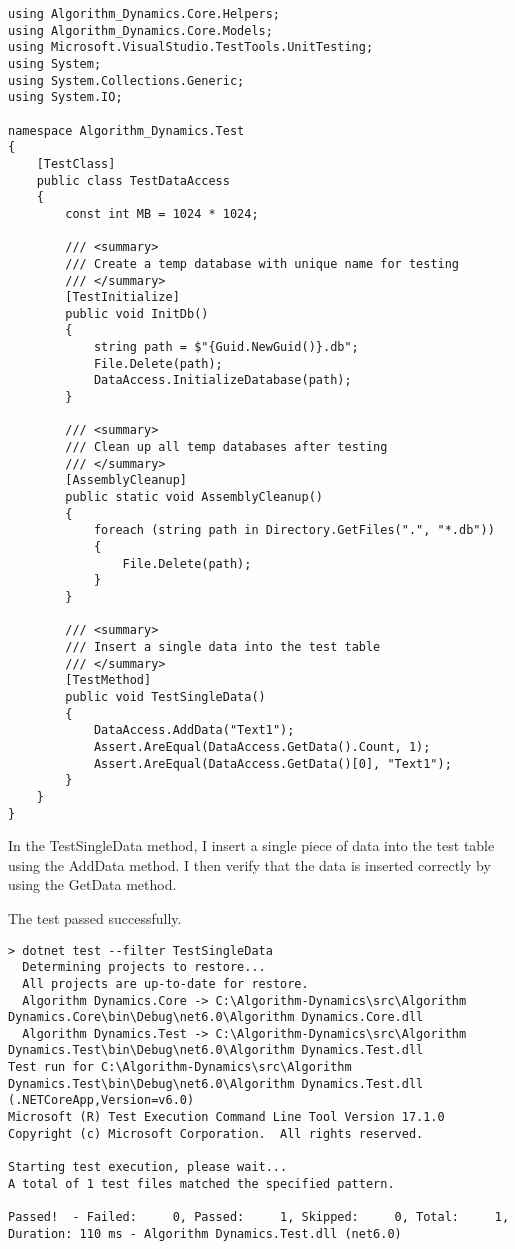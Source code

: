 \documentclass[report.tex]{subfiles}
\begin{document}
\begin{verbatim}
using Algorithm_Dynamics.Core.Helpers;
using Algorithm_Dynamics.Core.Models;
using Microsoft.VisualStudio.TestTools.UnitTesting;
using System;
using System.Collections.Generic;
using System.IO;

namespace Algorithm_Dynamics.Test
{
    [TestClass]
    public class TestDataAccess
    {
        const int MB = 1024 * 1024;

        /// <summary>
        /// Create a temp database with unique name for testing
        /// </summary>
        [TestInitialize]
        public void InitDb()
        {
            string path = $"{Guid.NewGuid()}.db";
            File.Delete(path);
            DataAccess.InitializeDatabase(path);
        }

        /// <summary>
        /// Clean up all temp databases after testing
        /// </summary>
        [AssemblyCleanup]
        public static void AssemblyCleanup()
        {
            foreach (string path in Directory.GetFiles(".", "*.db"))
            {
                File.Delete(path);
            }
        }

        /// <summary>
        /// Insert a single data into the test table
        /// </summary>
        [TestMethod]
        public void TestSingleData()
        {
            DataAccess.AddData("Text1");
            Assert.AreEqual(DataAccess.GetData().Count, 1);
            Assert.AreEqual(DataAccess.GetData()[0], "Text1");
        }
    }
}
\end{verbatim}

In the TestSingleData method, I insert a single piece of data into the test table using the AddData method. I then verify that the data is inserted correctly by using the GetData method.

The test passed successfully.

\begin{verbatim}
> dotnet test --filter TestSingleData
  Determining projects to restore...
  All projects are up-to-date for restore.
  Algorithm Dynamics.Core -> C:\Algorithm-Dynamics\src\Algorithm Dynamics.Core\bin\Debug\net6.0\Algorithm Dynamics.Core.dll
  Algorithm Dynamics.Test -> C:\Algorithm-Dynamics\src\Algorithm Dynamics.Test\bin\Debug\net6.0\Algorithm Dynamics.Test.dll
Test run for C:\Algorithm-Dynamics\src\Algorithm Dynamics.Test\bin\Debug\net6.0\Algorithm Dynamics.Test.dll (.NETCoreApp,Version=v6.0)
Microsoft (R) Test Execution Command Line Tool Version 17.1.0
Copyright (c) Microsoft Corporation.  All rights reserved.

Starting test execution, please wait...
A total of 1 test files matched the specified pattern.

Passed!  - Failed:     0, Passed:     1, Skipped:     0, Total:     1, Duration: 110 ms - Algorithm Dynamics.Test.dll (net6.0)
\end{verbatim}
\end{document}
